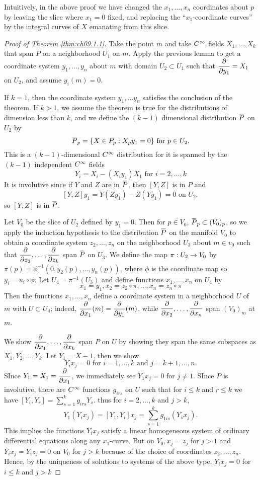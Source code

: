 \documentclass[../main]{subfiles}
\begin{document}
Intuitively, in the above proof we have changed the $x_1,\dots,x_n$ coordinates about $p$ by leaving the slice where $x_1=0$ fixed, and replacing the ``$x_1$-coordinate curves'' by the integral curves of $X$ emanating from this slice.
\begin{proof}[Proof of Theorem \ref{thm:ch09.1.1}]
Take the point $m$ and take $C^\infty$ fields $X_1,\dots,X_k$ that span $P$ on a neighborhood $U_1$ on $m$. Apply the previous lemma to get a coordinate system $y_1,\dots,y_n$ about $m$ with domain $U_2\subset U_1$ such that $\dfrac{\partial }{\partial y_1}=X_1$ on $U_2$, and assume $y_i(m)=0$.

If $k=1$, then the coordinate system $y_1,\dots y_n$ satisfies the conclusion of the theorem. If $k>1$, we assume the theorem is true for the distributions of dimension less than $k$, and we define the $(k-1)$ dimensional distribution $\xoverline{P}$ on $U_2$ by \[\xoverline{P}_p = \{X\in P_p: X_py_1=0\}\text{ for } p\in U_2.\] This is a $(k-1)$-dimensional $C^\infty$ distribution for it is spanned by the $(k-1)$ independent $C^\infty$ fields \[Y_i =X_i-(X_iy_1)X_1 \text{ for } i=2,\dots,k\]
It is involutive since if $Y$ and $Z$ are in $\xoverline{P}$, then $[Y,Z]$ is in $P$ and \[[Y,Z]y_1 = Y(Zy_1)-Z(Yy_1)=0\text{ on } U_2,\] so $[Y,Z]$ is in $\xoverline{P}$.

Let $V_0$ be the slice of $U_2$ defined by $y_1=0$. Then for $p\in V_0$, $\xoverline{P}_p\subset (V_0)_p$, so we apply the induction hypothesis to the distribution $\xoverline{P}$ on the manifold $V_0$ to obtain a coordinate system $z_2,\dots,z_n$ on the neighborhood $U_3$ about $m\in v_0$ such that $\dfrac{\partial }{\partial z_2},\dots,\dfrac{\partial }{\partial z_k}$ span $\xoverline{P}$ on $U_3$. We define the map $\pi: U_2\to V_0$ by $\pi(p)=\phi^{-1}(0,y_2(p),\dots,y_n(p))$, where $\phi$ is the coordinate map so $y_i=u_i\circ \phi$. Let $U_4 = \pi^{-1}(U_3)$ and define functions $x_1,\dots,x_n$ on $U_4$ by \[x_1=y_1, x_2= z_2\circ \pi,\dots,x_n=z_n\circ \pi\] Then the functions $x_1,\dots,x_n$ define a coordinate system in a neighborhood $U$ of $m$ with $U\subset U_4$; indeed, $\dfrac{\partial }{\partial x_1}(m) = \dfrac{\partial }{\partial y_1}(m)$, while $\dfrac{\partial }{\partial x_2},\dots, \dfrac{\partial }{\partial x_n}$ span $(V_0)_m$ at $m$.

We show $\dfrac{\partial }{\partial x_1},\dots ,\dfrac{\partial }{\partial x_k}$ span $P$ on $U$ by showing they span the same subspaces as $X_1,Y_2,\dots,Y_k$. Let $Y_1=X-1$, then we show \[Y_ix_j =0 \text{ for } i=1,\dots,k\text{ and } j=k+1,\dots,n.\] SInce $Y_1=X_1=\dfrac{\partial }{\partial x_1}$, we immediately see $Y_1x_j=0$ for $j\neq 1$. SInce $P$ is involutive, there are $C^\infty$ functions $g_{irs}$ on $U$ such that for $i\leq k$ and $r\leq k$ we have $[Y_i,Y_r] = \sum_{s=1}^k g_{irs}Y_s$. thus for $i=2,\dots,k$ and $j>k$, \[Y_1(Y_ix_j) = [Y_1,Y_i]x_j = \sum_{s=1}^k g_{1is}(Y_sx_j).\]
This implies the functions $Y_ix_j$ satisfy a linear homogeneous system of ordinary differential equations along any $x_1$-curve. But on $V_0,x_j=z_j$ for $j>1$ and $Y_ix_j=Y_iz_j=0$ on $V_0$ for $j>k$ because of the choice of coordinates $z_2,\dots,z_n$. Hence, by the uniqueness of solutions to systems of the above type, $Y_ix_j=0$ for $i\leq k$ and $j>k$
\end{proof}
\end{document}
